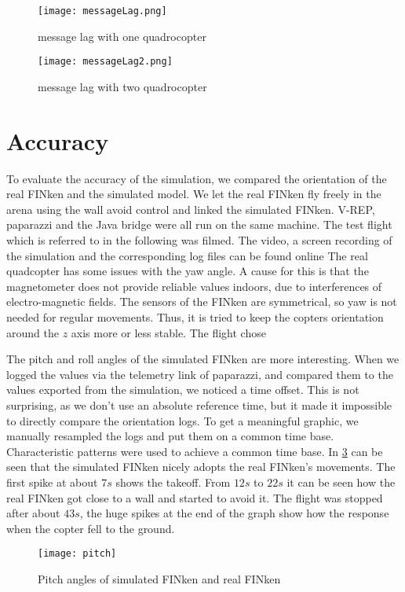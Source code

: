 \begin{figure}[h!]
 \begin{center}
  \texttt{[image: messageLag.png]}
 \end{center}
  \caption{message lag with one quadrocopter\label{fig:messageLag}}
\end{figure}

\begin{figure}[h!]
 \begin{center}
  \texttt{[image: messageLag2.png]}
 \end{center}
  \caption{message lag with two quadrocopter\label{fig:messageLag2}}
\end{figure}



\section{Accuracy}

To evaluate the accuracy of the simulation, we compared the orientation of the real FINken and the simulated model.  
We let the real FINken fly freely in the arena using the wall avoid control and linked the simulated FINken.
V-REP, paparazzi and the Java bridge were all run on the same machine.
The test flight which is referred to in the following was filmed.
The video, a screen recording of the simulation and the corresponding log files can be found online  
The real quadcopter has some issues with the yaw angle. 
A cause for this is that the magnetometer does not provide reliable values indoors, due to interferences of electro-magnetic fields.
The sensors of the FINken are symmetrical, so yaw is not needed for regular movements.
Thus, it is tried to keep the copters orientation around the $z$ axis more or less stable.
The flight chose

The pitch and roll angles of the simulated FINken are more interesting.
When we logged the values via the telemetry link of paparazzi, and compared them to the values exported from the simulation, we noticed a time offset. 
This is not surprising, as we don't use an absolute reference time, but it made it impossible to directly compare the orientation logs.
To get a meaningful graphic, we manually resampled the logs and put them on a common time base.
Characteristic patterns were used to achieve a common time base.
In \ref{pic:pitchResponse} can be seen that the simulated FINken nicely adopts the real FINken's movements. 
The first spike at about $7s$ shows the takeoff. 
From $12s$ to $22s$ it can be seen how the real FINken got close to a wall and started to avoid it. 
The flight was stopped after about $43s$, the huge spikes at the end of the graph show how the response when the copter fell to the ground.
\begin{figure}
	\begin{center}
	\texttt{[image: pitch]}
	\caption{Pitch angles of simulated FINken and real FINken}
	\label{pic:pitchResponse}
	\end{center}
\end{figure}

